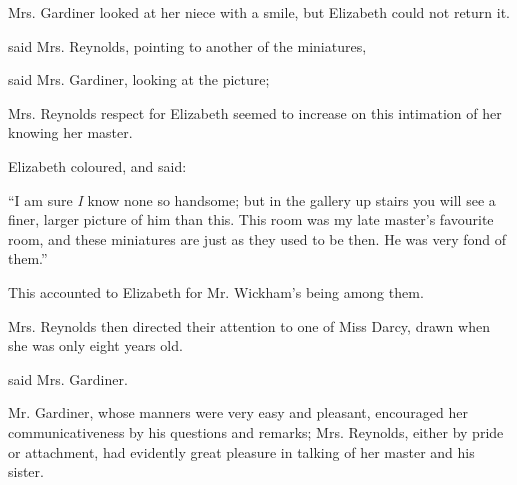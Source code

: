 Mrs. Gardiner looked at her niece with a smile, but Elizabeth could not return it.

 said Mrs. Reynolds, pointing to another of the miniatures, 

 said Mrs. Gardiner, looking at the picture; 

Mrs. Reynolds respect for Elizabeth seemed to increase on this intimation of her knowing her master.


Elizabeth coloured, and said: 



“I am sure {\em I} know none so handsome; but in the gallery up stairs you will see a finer, larger picture of him than this. This room was my late master's favourite room, and these miniatures are just as they used to be then. He was very fond of them.”

This accounted to Elizabeth for Mr. Wickham's being among them.

Mrs. Reynolds then directed their attention to one of Miss Darcy, drawn when she was only eight years old.

 said Mrs. Gardiner.


Mr. Gardiner, whose manners were very easy and pleasant, encouraged her communicativeness by his questions and remarks; Mrs. Reynolds, either by pride or attachment, had evidently great pleasure in talking of her master and his sister.



